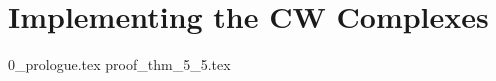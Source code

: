 \documentclass[class=article, crop=false]{standalone}
\begin{document}
\section{Implementing the CW Complexes}	

{0_prologue.tex}
{proof_thm_5_5.tex}
\end{document}
